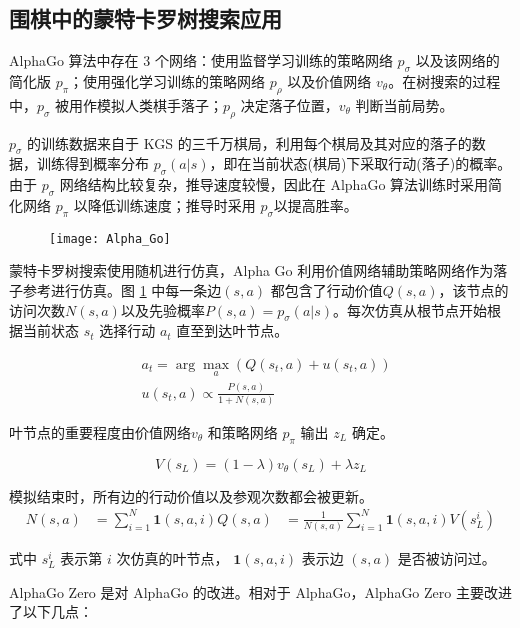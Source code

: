 \subsection{围棋中的蒙特卡罗树搜索应用}
\label{sec:AlphaGo}
AlphaGo 算法中存在 3 个网络：使用监督学习训练的策略网络 $p_\sigma$ 以及该网络的简化版 $p_\pi$；使用强化学习训练的策略网络 $p_\rho$ 以及价值网络 $v_\theta$。在树搜索的过程中，$p_\sigma$ 被用作模拟人类棋手落子；$p_\rho$ 决定落子位置，$v_\theta$ 判断当前局势。

$p_\sigma$ 的训练数据来自于 KGS 的三千万棋局，利用每个棋局及其对应的落子的数据，训练得到概率分布 $p_\sigma(a|s)$，即在当前状态(棋局)下采取行动(落子)的概率。由于 $p_\sigma$ 网络结构比较复杂，推导速度较慢，因此在 AlphaGo 算法训练时采用简化网络 $p_\pi$ 以降低训练速度；推导时采用 $p_\sigma$以提高胜率。

\begin{figure}[!htbp]
    \centering
    \texttt{[image: Alpha\_Go]}
    \label{fig:Alpha_Go}
\end{figure}

蒙特卡罗树搜索使用随机进行仿真，Alpha Go 利用价值网络辅助策略网络作为落子参考进行仿真。图 \ref{fig:Alpha_Go} 中每一条边$(s, a)$ 都包含了行动价值$Q(s,a)$，该节点的访问次数$N(s,a)$以及先验概率$P(s,a) = p_\sigma(a|s)$。每次仿真从根节点开始根据当前状态 $s_t$ 选择行动 $a_t$ 直至到达叶节点。

\begin{equation}
\begin{aligned}
&a_t = \arg\max_a(Q(s_t,a) + u(s_t,a)) \\
&u(s_t,a) \propto \frac{P(s,a)}{1+N(s,a)}
\end{aligned}
\end{equation}

叶节点的重要程度由价值网络$v_\theta$ 和策略网络 $p_\pi$ 输出 $z_L$ 确定。

$$
V(s_L) = (1-\lambda)v_\theta(s_L) + \lambda z_L
$$

模拟结束时，所有边的行动价值以及参观次数都会被更新。
$$
\begin{aligned}
N(s,a) &= \sum_{i=1}^N\mathbf{1}(s,a,i)
Q(s,a) &= \frac{1}{N(s,a)}\sum_{i=1}^N\mathbf{1}(s,a,i)V(s_L^i)
\end{aligned}
$$

式中 $s_L^i$ 表示第 $i$ 次仿真的叶节点， $\mathbf{1}(s,a,i)$ 表示边 $(s,a)$ 是否被访问过。

AlphaGo Zero 是对 AlphaGo 的改进。相对于 AlphaGo，AlphaGo Zero 主要改进了以下几点：


